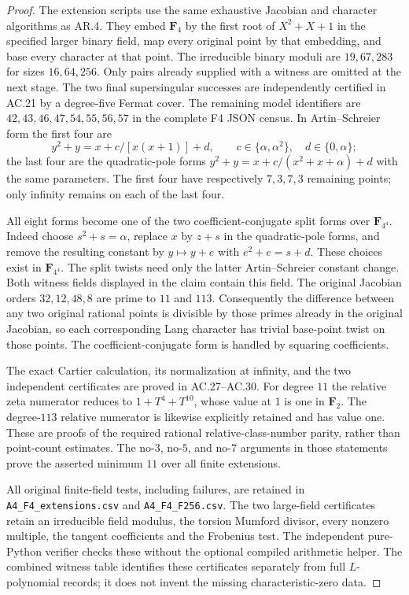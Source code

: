 \begin{proof}
The extension scripts use the same exhaustive Jacobian and character
algorithms as AR.4. They embed $\mathbf F_4$ by the first root of
$X^2+X+1$ in the specified larger binary field, map every original
point by that embedding, and base every character at that point.
The irreducible binary moduli are $19,67,283$ for sizes $16,64,256$.
Only pairs already supplied with a witness are omitted at the next
stage. The two final supersingular successes are independently
certified in AC.21 by a degree-five Fermat cover.
The remaining model identifiers are
$42,43,46,47,54,55,56,57$ in the complete F4 JSON census.
In Artin--Schreier form the first four are
\[
 y^2+y=x+c/[x(x+1)]+d,
 \qquad c\in\{\alpha,\alpha^2\},\quad d\in\{0,\alpha\};
\]
the last four are the quadratic-pole forms
$y^2+y=x+c/(x^2+x+\alpha)+d$ with the same parameters.
The first four have respectively $7,3,7,3$ remaining points;
only infinity remains on each of the last four.

All eight forms become one of the two coefficient-conjugate split
forms over $\mathbf F_{4^4}$. Indeed choose $s^2+s=\alpha$, replace
$x$ by $z+s$ in the quadratic-pole forms, and remove the resulting
constant by $y\mapsto y+e$ with $e^2+e=s+d$. These choices exist
in $\mathbf F_{4^4}$. The split twists need only the latter
Artin--Schreier constant change. Both witness fields displayed in
the claim contain this field. The original Jacobian orders
$32,12,48,8$ are prime to $11$ and $113$. Consequently the difference
between any two original rational points is divisible by those
primes already in the original Jacobian, so each corresponding
Lang character has trivial base-point twist on those points.
The coefficient-conjugate form is handled by squaring coefficients.

The exact Cartier calculation, its normalization at infinity,
and the two independent certificates are proved in AC.27--AC.30.
For degree $11$ the relative zeta numerator reduces to
$1+T^4+T^{10}$, whose value at $1$ is one in $\mathbf F_2$.
The degree-$113$ relative numerator is likewise explicitly retained
and has value one. These are proofs of the required rational
relative-class-number parity, rather than point-count estimates.
The no-$3$, no-$5$, and no-$7$ arguments in those statements prove
the asserted minimum $11$ over all finite extensions.

All original finite-field tests, including failures, are retained
in \texttt{A4\_F4\_extensions.csv} and
\texttt{A4\_F4\_F256.csv}. The two large-field certificates retain
an irreducible field modulus, the torsion Mumford divisor, every
nonzero multiple, the tangent coefficients and the Frobenius test.
The independent pure-Python verifier checks these without the
optional compiled arithmetic helper. The combined witness table
identifies these certificates separately from full $L$-polynomial
records; it does not invent the missing characteristic-zero data.
\end{proof}

